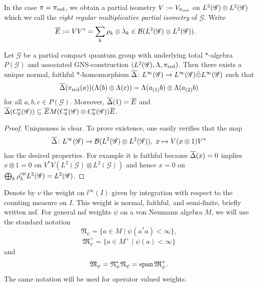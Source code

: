 In the case  $\pi=\pi_{\operatorname{\mathrm{red}}}$, we obtain a partial isometry
$V:=V_{\pi_{\operatorname{\mathrm{red}}}}$ on $L^{2}(\mathscr{G}) \otimes L^{2}(\mathscr{G})$ which we call the
\emph{right regular multiplicative partial isometry} of
$\mathscr{G}$. Write
\begin{align*}
  \overline{E} &:=VV^{*} = \sum_{k} \rho_{k} \otimes \lambda_{k} \in
  \mathcal{B}(L^{2}(\mathscr{G}) \otimes L^{2}(\mathscr{G})).
\end{align*}
\begin{Prop} \label{prop:vn-delta} Let $\mathscr{G}$ be a partial
  compact quantum group with underlying total $*$-algebra
  $P(\mathscr{G})$ and associated GNS-construction
  $(L^{2}(\mathscr{G}),\Lambda,\pi_{\operatorname{\mathrm{red}}})$. Then there
  exists a unique normal, faithful $*$-homomorphism $\overline{\Delta} \colon
  L^{\infty}(\mathscr{G}) \to L^{\infty}(\mathscr{G}) \bar{\otimes} L^{\infty}(\mathscr{G})$ such that
  \begin{align*}
    \overline{\Delta}(\pi_{\operatorname{\mathrm{red}}}(a)) (\Lambda(b) \otimes \Lambda(c)) =
    \Lambda(a_{(1)}b) \otimes \Lambda(a_{(2)}b) 
  \end{align*}
  for all $a,b,c \in P(\mathscr{G})$. Moreover, $\overline{\Delta}(1)=\overline{E}$ and
  $\overline{\Delta}(C^{r}_{0}(\mathscr{G})) \subseteq \overline{E} M(C^{r}_{0}(\mathscr{G}) \otimes
  C^{r}_{0}(\mathscr{G}))\overline{E}$.
\end{Prop}
\begin{proof}
  Uniqueness is clear. To prove existence, one easily verifies that
  the map
  \begin{align*}
 \overline{\Delta} \colon L^{\infty}(\mathscr{G}) \to {\cal B}(L^{2}(\mathscr{G}) \otimes L^{2}(\mathscr{G})), \ x
  \mapsto V(x \otimes 1)V^{*}   
  \end{align*}
  has the desired properties. For example it is faithful because
  $\overline{\Delta}(x)=0$ implies $x\otimes 1=0$ on $V^{*}V(L^{2}(\mathscr{G})
  \otimes L^{2}(\mathscr{G}))$ and hence $x=0$ on $\bigoplus_{k}
  \rho_{k}^{\operatorname{\mathrm{op}}}L^{2}(\mathscr{G})=L^{2}(\mathscr{G})$.
\end{proof}

Denote by $\nu$ the weight on $l^{\infty}(I)$ given by
integration with respect to the counting measure on $I$. This weight is
normal, faithful, and semi-finite,  briefly written nsf. For general nsf weights $\psi$ on a von Neumann algebra $M$, we will use the standard notation \[\mathfrak{N}_{\psi} = \{a\in M\mid \psi(a^*a)<\infty\},\]\[\mathfrak{M}_{\psi}^+  = \{a\in M^+\mid\psi(a)<\infty\}\] and \[\mathfrak{M}_{\psi} = \mathfrak{N}_{\psi}^*\mathfrak{N}_{\psi} = \operatorname{\mathrm{span}} \mathfrak{M}_{\psi}^+.\] The same notation will be used for operator valued weights.

